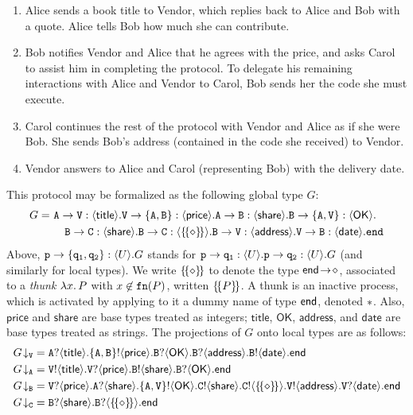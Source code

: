 \documentclass[runningheads,plain]{llncs}
\begin{document}
\begin{enumerate}[1.]
\item Alice sends a book title to Vendor, which replies back to Alice and Bob with a quote. Alice tells Bob how much she can contribute.
\item Bob notifies Vendor and Alice that he agrees with the price, and asks Carol to assist him in completing the protocol. 
To delegate his remaining interactions with Alice and Vendor to Carol, Bob sends her %
the code she must execute.
\item Carol continues the rest of the protocol with Vendor and Alice as if she were Bob. 
She sends Bob's address (contained in the  code she received) to Vendor.
\item Vendor answers to Alice and Carol (representing Bob) with the delivery date.
\end{enumerate}
This protocol may be formalized as the following global type $G$:
\begin{align*}
G = ~&  \mathtt{A}\to\mathtt{\mathtt{V}}:\langle \mathsf{title}\rangle.\mathtt{\mathtt{V}}\to\mathtt{\{A,B\}}:\langle \mathsf{price}\rangle.\mathtt{A}\to\mathtt{B}:\langle \mathsf{share}\rangle.
 \mathtt{B}\to\mathtt{\{A,\mathtt{V}\}}:\langle \mathsf{OK}\rangle.\\
& \quad
 \mathtt{B}\to\mathtt{C}:\langle \mathsf{share}\rangle.\mathtt{B}\to\mathtt{C}:\langle \{\!\{\diamond\}\!\}\rangle.
\mathtt{B}\to\mathtt{\mathtt{V}}:\langle \mathsf{address}\rangle. \mathtt{\mathtt{V}}\to\mathtt{B}:\langle \mathsf{date}\rangle.\mathtt{end}
\end{align*}
Above,  
$\mathtt{\mathtt{p}}\to\mathtt{\{\mathtt{q}_1,\mathtt{q}_2\}}:\langle U\rangle.G$
stands for 
$\mathtt{\mathtt{p}}\to\mathtt{\mathtt{q}_1}:\langle U\rangle.\mathtt{\mathtt{p}}\to\mathtt{\mathtt{q}_2}:\langle U\rangle.G$
(and similarly for local types).
We write $\{\!\{\diamond\}\!\}$ to denote the type $\mathsf{end}\! \rightarrow\! \diamond$, associated to a \emph{thunk} $\lambda x.\,P$ with $x \not \in \mathtt{fn}(P)$, written
$\{\!\{P\}\!\}$. A thunk is an inactive process, which is activated by applying to it a dummy name of type $\mathsf{end}$, denoted $\ast$.
Also, $\mathsf{price}$ and $\mathsf{share}$ are base types treated as integers;
  $\mathsf{title}$, $\mathsf{OK}$, $\mathsf{address}$, and $\mathsf{date}$ are base types treated as strings.
The projections of $G$ onto local types are as follows:
\begin{align*}
\tproj{G}{\pS} & = \ltinp{A}{\mathsf{title}}{\ltout{\{A,B\}}{\mathsf{price}}{\ltinp{B}{\mathsf{OK}}{\ltinp{B}{\mathsf{address}}{\ltout{B}{\mathsf{date}}{\lend}}}}}
\\
\tproj{G}{\pA} & = \ltout{\pS}{\mathsf{title}}{\ltinp{\pS}{\mathsf{price}}{\ltout{B}{\mathsf{share}}{\ltinp{B}{\mathsf{OK}}{\lend}}}}
\\
\tproj{G}{\pB} & = \ltinp{\pS}{\mathsf{price}}{\ltinp{A}{\mathsf{share}}{\ltout{\{A,\pS\}}{\mathsf{OK}}{
\ltout{C}{\mathsf{share}}{\ltout{C}{\thunkt}{
 \ltout{\pS}{\mathsf{address}}{\ltinp{\pS}{\mathsf{date}}{\lend}}}}}}}
\\
\tproj{G}{\pC} & = \ltinp{B}{\mathsf{share}}{\ltinp{B}{\thunkt}{\lend}}
\end{align*}
\end{document}
